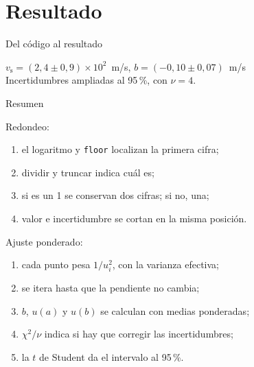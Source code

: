\documentclass[10pt]{beamer}
\newcommand{\resalta}[1]{\textcolor{structure.fg!75!white}{#1}}
\newcommand{\vs}{v_{\mathrm{s}}}
\begin{document}
\section{Resultado}
\begin{frame}{Del código al resultado}
  \begin{center}
    \scriptsize
    
  \end{center}
  \begin{block}{}
    \centering
    $\vs=(2{,}4\pm0{,}9)\times10^{2}$~m/s, \qquad $b=(-0{,}10\pm0{,}07)$~m/s\\[1pt]
    {\footnotesize Incertidumbres ampliadas al 95\,\%, con $\nu=4$.}
  \end{block}
\end{frame}

\begin{frame}{Resumen}
  \begin{block}{}
    \resalta{Redondeo:}
    \begin{enumerate}
      \item el logaritmo y \texttt{floor} localizan la primera cifra;
      \item dividir y truncar indica cuál es;
      \item si es un 1 se conservan dos cifras; si no, una;
      \item valor e incertidumbre se cortan en la misma posición.
    \end{enumerate}
  \end{block}
  \begin{block}{}
    \resalta{Ajuste ponderado:}
    \begin{enumerate}
      \item cada punto pesa $1/u_i^{2}$, con la varianza efectiva;
      \item se itera hasta que la pendiente no cambia;
      \item $b$, $u(a)$ y $u(b)$ se calculan con medias ponderadas;
      \item $\chi^{2}/\nu$ indica si hay que corregir las incertidumbres;
      \item la $t$ de Student da el intervalo al 95\,\%.
    \end{enumerate}
  \end{block}
\end{frame}
\end{document}
